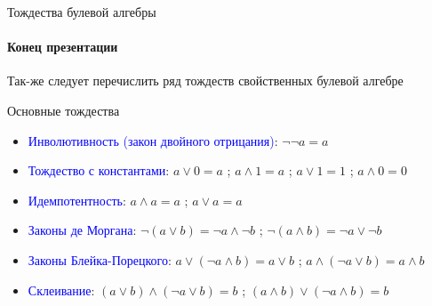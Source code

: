 \documentclass[aspectratio=169]{beamer}
\newcommand{\blu}{\textcolor{blue}}
\begin{document}
\begin{frame}{Тождества булевой алгебры}
\framesubtitle{Конец презентации}
Так-же следует перечислить ряд тождеств свойственных булевой алгебре
\begin{exampleblock}{Основные тождества}
    \begin{itemize}
        \item  \blu{Инволютивность (закон двойного отрицания)}: $\neg \neg a=a$
        \item \blu{Тождество с константами}: $a\vee 0=a$ ; $a\wedge1=a$ ; $a\vee 1=1$ ; $a\wedge 0=0$
        \item \blu{Идемпотентность}: $a\wedge a=a$ ; $a\vee a=a$
        \item \blu{Законы де Моргана}: $\neg (a\vee b)=\neg a\wedge \neg b$ ; $\neg (a\wedge b)=\neg a\vee \neg b$
        \item \blu{Законы Блейка-Порецкого}: $a\vee (\neg a\wedge b)=a\vee b$ ; $a\wedge (\neg a\vee b)=a\wedge b$
        \item \blu{Склеивание}: $(a\vee b)\wedge (\neg a\vee b)=b$ ; $(a\wedge b)\vee (\neg a\wedge b)=b$
    \end{itemize}
\end{exampleblock}    
\end{frame}
\end{document}
